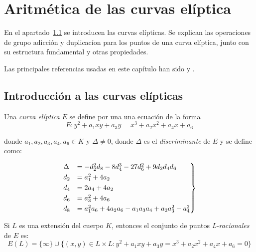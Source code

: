 \chapter{Aritmética de las curvas elíptica}
\label{ch:Aritmética de las curvas elíptica}


En el apartado~\ref{sec:Introducción} se introducen las curvas elípticas. Se explican las operaciones de grupo adicción y duplicacíon para los puntos de una curva elíptica, junto con su estructura fundamental y otras propiedades.

Las principales referencias usadas en este capítulo han sido \citet{Washington:2008} y \citet{Hankerson:2003}.


\section{Introducción a las curvas elípticas}
\label{sec:Introducción}

\begin{definicion}
\label{def:curva elíptica}
	Una \emph{curva elíptica} $E$ se define por una una ecuación de la forma
	\begin{equation}
	\label{eq:Weierstrass general}
		E : y^2 + a_1 x y + a_3 y = x^3 + a_2 x^2 + a_4 x + a_6
	\end{equation}

	donde $a_1, a_2, a_3, a_4, a_6 \in K$ y $\Delta \neq 0$, donde $\Delta$ es el \emph{discriminante} de $E$ y se define como:

	\begin{align}
		\label{eq:discriminante}
		\begin{rcases}
		\Delta & = -d_2^2 d_8 - 8 d_4^3 - 27 d_6^2 + 9 d_2 d_4 d_6         \\
		d_2    & = a_1^2 + 4 a_ 2                                          \\
		d_4    & = 2 a_4 + 4 a_2                                           \\
		d_6    & = a_3^2 + 4 a_6                                           \\
		d_8    & = a_1^2 a_6 + 4 a_2 a_6 - a_1 a_3 a_4 + a_2 a_3^2 - a_4^2 \\
		\end{rcases}
	\end{align}

	Si $L$ es una extensión del cuerpo $K$, entonces el conjunto de puntos \emph{L-racionales} de $E$ es:
	$$
	E(L) = \{\infty\} \cup \{(x, y) \in L \times L: y^2 + a_1 x y + a_3 y = x^3 + a_2 x^2 + a_4 x + a_6 = 0\}
	$$
\end{definicion}

